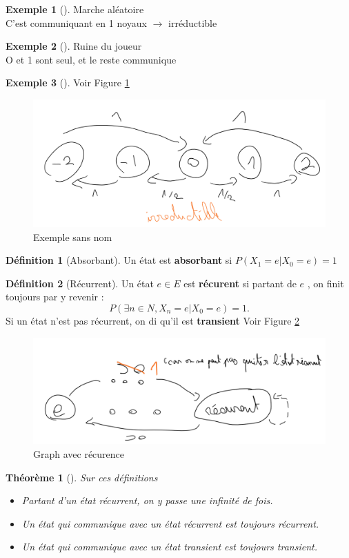\documentclass{article}
\theoremstyle{plain}%
\newtheorem{thm}{Théorème}[section]
\theoremstyle{definition}
\newtheorem{defn}{Définition}[section]
\newtheorem{exmp}{Exemple}[section]
\theoremstyle{remark}
\begin{document}
\begin{exmp}[]
	Marche aléatoire \\
	C'est communiquant en 1 noyaux $\rightarrow$ irréductible
\end{exmp}

\begin{exmp}[]
	Ruine du joueur \\
	O et 1 sont seul, et le reste communique 
\end{exmp}

\begin{exmp}[]
	Voir Figure \ref{exm_no_name}
	\begin{figure}[htbp]
		\centering
		\includegraphics[width=.5\textwidth]{figures_chap1/figure6.png}
		\caption{Exemple sans nom}
		\label{exm_no_name}
	\end{figure}
\end{exmp}

\begin{defn}[Absorbant]
	Un état est \textbf{absorbant} si $ P(X_1 = e| X_0 = e) = 1 $
\end{defn}

\begin{defn}[Récurrent]
	Un état $ e \in E $ est \textbf{récurent} si partant de $ e $ , on finit toujours par y revenir : 
	\[
		P(\exists n \in N, X_n =e | X_0 = e) = 1
	.\]
	Si un état n'est pas récurrent, on di qu'il est \textbf{transient}
	Voir Figure \ref{recurent}
	\begin{figure}[htbp]
		\centering
		\includegraphics[width=.5\textwidth]{figures_chap1/figure7.png}
		\caption{Graph avec récurence}
		\label{recurent}
	\end{figure}
\end{defn}
\begin{thm}[]
	Sur ces définitions \\
	\begin{itemize}
		\item Partant d'un état récurrent, on y passe une infinité de fois.
		\item Un état qui communique avec un état récurrent est toujours récurrent.
		\item Un état qui communique avec un état transient est toujours transient.
	\end{itemize}
\end{thm}
\end{document}
